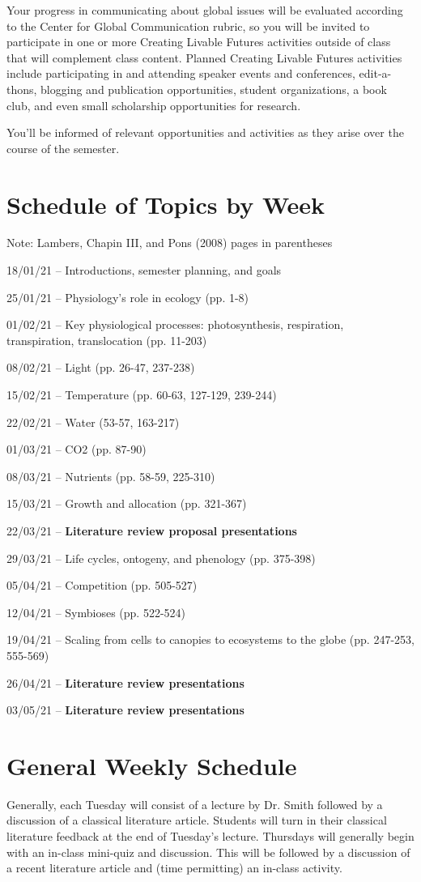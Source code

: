 \documentclass[12pt, notitlepage]{article}   	%
\begin{document}
{Your progress in communicating about global issues will be evaluated according to the 
Center for Global Communication rubric, so you will be invited to participate 
in one or more Creating Livable Futures activities outside of class that will 
complement class content. 
Planned Creating Livable Futures activities include participating in and attending 
speaker events and conferences, edit-a-thons, blogging and publication opportunities, 
student organizations, a book club, and even small scholarship opportunities for research. 

You’ll be informed of relevant opportunities and activities as they arise over 
the course of the semester.

\newpage

\section*{Schedule of Topics by Week}
Note: Lambers, Chapin III, and Pons (2008) pages in parentheses \par
18/01/21 – Introductions, semester planning, and goals \par
25/01/21 – Physiology’s role in ecology (pp. 1-8) \par
01/02/21 – Key physiological processes: 
photosynthesis, respiration, transpiration, translocation (pp. 11-203) \par
08/02/21 – Light (pp. 26-47, 237-238) \par
15/02/21 – Temperature (pp. 60-63, 127-129, 239-244) \par
22/02/21 – Water (53-57, 163-217) \par
01/03/21 – CO2 (pp. 87-90) \par
08/03/21 – Nutrients (pp. 58-59, 225-310) \par
15/03/21 – Growth and allocation (pp. 321-367) \par
22/03/21 – \textbf{Literature review proposal presentations} \par
29/03/21 – Life cycles, ontogeny, and phenology (pp. 375-398) \par
05/04/21 – Competition (pp. 505-527) \par
12/04/21 – Symbioses (pp. 522-524) \par
19/04/21 – Scaling from cells to canopies to ecosystems to the globe 
(pp. 247-253, 555-569) \par
26/04/21 – \textbf{Literature review presentations} \par
03/05/21 – \textbf{Literature review presentations} \par

\section*{General Weekly Schedule}
Generally, each Tuesday will consist of a lecture by Dr. Smith followed by a discussion
of a classical literature article. Students will turn in their classical literature
feedback at the end of Tuesday's lecture. Thursdays will generally begin with an in-class
mini-quiz and discussion. 
This will be followed by a discussion of a recent literature article and
(time permitting) an in-class activity.

} %
\end{document}
